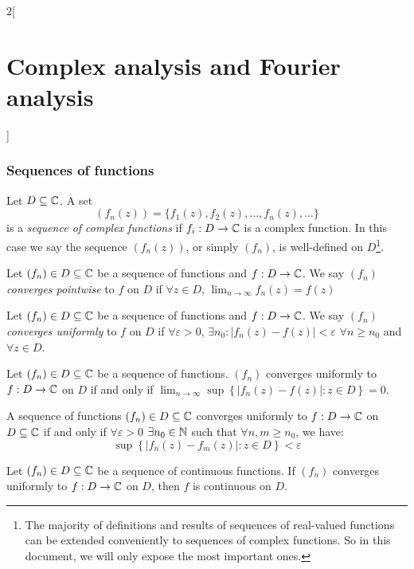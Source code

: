 \documentclass[../../../main.tex]{subfiles}
\begin{document}
\begin{multicols}{2}[\section{Complex analysis and Fourier analysis}]
  \subsubsection{Sequences of functions}
  \begin{definition}
    Let $D\subseteq\mathbb{C}$. A set $$(f_n(z))=\{f_1(z),f_2(z),\ldots,f_n(z),\ldots\}$$ is a \emph{sequence of complex functions} if $f_i:D\rightarrow\mathbb{C} $ is a complex function. In this case we say the sequence $(f_n(z))$, or simply $(f_n)$, is well-defined on $D$\footnote{The majority of definitions and results of sequences of real-valued functions can be extended conveniently to sequences of complex functions. So in this document, we will only expose the most important ones.}.
  \end{definition}
  \begin{definition}
    Let $(f_n)\in D\subseteq\mathbb{C}$ be a sequence of functions and $f:D\rightarrow\mathbb{C}$. We say $(f_n)$ \emph{converges pointwise} to $f$ on $D$ if $\forall z\in D$, $\displaystyle\lim_{n\to\infty}f_n(z)=f(z)$
  \end{definition}
  \begin{definition}
    Let $(f_n)\in D\subseteq\mathbb{C}$ be a sequence of functions and $f:D\rightarrow\mathbb{C}$. We say $(f_n)$ \emph{converges uniformly} to $f$ on $D$ if $\forall\varepsilon>0$, $\exists n_0:|f_n(z)-f(z)|<\varepsilon$ $\forall n\geq n_0$ and $\forall z\in D$.
  \end{definition}
  \begin{lemma}
    Let $(f_n)\in D\subseteq\mathbb{C}$ be a sequence of functions. $(f_n)$ converges uniformly to $f:D\rightarrow\mathbb{C}$ on $D$ if and only if $\displaystyle \lim_{n\to\infty}\sup\left\{|f_n(z)-f(z)|:z\in D\right\}=0$.
  \end{lemma}
  \begin{theorem}
    A sequence of functions $(f_n)\in D\subseteq\mathbb{C}$ converges uniformly to $f:D\rightarrow\mathbb{C}$ on $D\subseteq\mathbb{C}$ if and only if $\forall\varepsilon>0$ $\exists n_0\in\mathbb{N}$ such that  $\forall n,m\geq n_0$, we have: $$\sup\left\{|f_n(z)-f_m(z)|:z\in D\right\}< \varepsilon$$
  \end{theorem}
  \begin{theorem}
    Let $(f_n)\in D\subseteq\mathbb{C}$ be a sequence of continuous functions. If $(f_n)$ converges uniformly to $f:D\rightarrow\mathbb{C}$ on $D$, then $f$ is continuous on $D$.
  \end{theorem}

\end{multicols}
\end{document}
